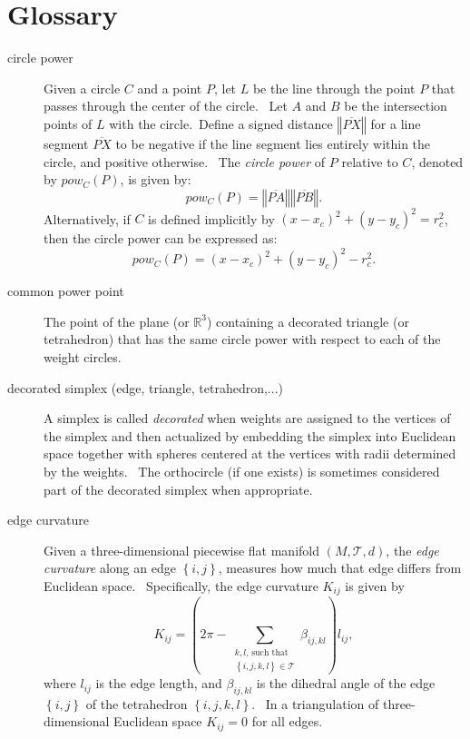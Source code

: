                       


\chapter{Glossary}

\begin{description}
\item[circle power] Given a circle $C$ and a point $P$, let $L$ be the line
through the point $P$ that passes through the center of the circle. \ Let $A$
and $B$ be the intersection points of $L$ with the circle.\ Define a signed
distance $\left\Vert \overline{PX}\right\Vert $ for a line segment $%
\overline{PX}$ to be negative if the line segment lies entirely within the
circle, and positive otherwise. \ The \textit{circle power} of $P$ relative
to $C$, denoted by $pow_{C}\left( P\right) $, is given by:%
\[
pow_{C}\left( P\right) =\left\Vert \overline{PA}\right\Vert \left\Vert 
\overline{PB}\right\Vert .
\]%
Alternatively, if $C$ is defined implicitly by $\left( x-x_{c}\right)
^{2}+\left( y-y_{c}\right) ^{2}=r_{c}^{2}$, then the circle power can be
expressed as:%
\[
pow_{C}\left( P\right) =\left( x-x_{c}\right) ^{2}+\left( y-y_{c}\right)
^{2}-r_{c}^{2}.
\]

\item[common power point] The point of the plane (or $%
\mathbb{R}
^{3}$) containing a decorated triangle (or tetrahedron) that has the same
circle power with respect to each of the weight circles. \ 

\item[decorated simplex (edge, triangle, tetrahedron,...)] A simplex is
called \textit{decorated} when weights are assigned to the vertices of the
simplex and then actualized by embedding the simplex into Euclidean space
together with spheres centered at the vertices with radii determined by the
weights. \ The orthocircle (if one exists) is sometimes considered part of
the decorated simplex when appropriate.

\item[edge curvature] Given a three-dimensional piecewise flat manifold $%
\left( M,\mathcal{T},d\right) $, the \textit{edge curvature} along an edge $%
\left\{ i,j\right\} $, measures how much that edge differs from Euclidean
space. \ Specifically, the edge curvature $K_{ij}$ is given by 
\[
K_{ij}=\left( 2\pi -\sum\limits_{\substack{ k,l\text{, such that}  \\ %
\left\{ i,j,k,l\right\} \in \mathcal{T}}}\beta _{ij,kl}\right) l_{ij},
\]%
where $l_{ij}$ is the edge length, and $\beta _{ij,kl}$ is the dihedral
angle of the edge $\left\{ i,j\right\} $ of the tetrahedron $\left\{
i,j,k,l\right\} $. \ In a triangulation of three-dimensional Euclidean space 
$K_{ij}=0$ for all edges. \ 


\end{description}
